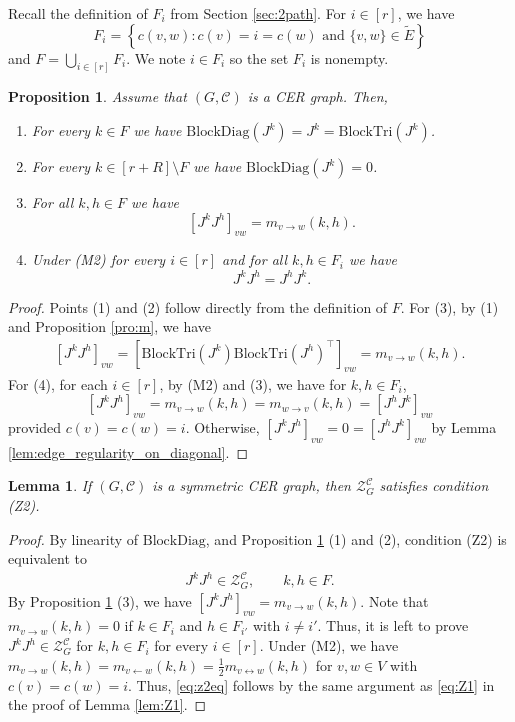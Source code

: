 \documentclass[12pt]{amsart}
\theoremstyle{plain}
\newtheorem{propo}[theorem]{Proposition}
\newtheorem{lemma}[theorem]{Lemma}
\theoremstyle{definition}
\theoremstyle{remark}
\newcommand{\1}{\mathbf{1}}
\newcommand{\coloredZ}{\mathcal{Z}_{G}^{\mathcal{C}}}
\newcommand{\bdiag}{\mathrm{BlockDiag}}
\newcommand{\tri}{\mathrm{BlockTri}}
\begin{document}
Recall the definition of $F_i$ from Section \ref{sec:2path}. 
For $i\in[r]$, we have
\[
F_i = \left\{c(v,w)\colon c(v)=i=c(w)\mbox{ and }\{v,w\}\in \tilde{E}\right\}
\]
and $F = \bigcup_{i\in [r]} F_i$.
We note $i\in F_i$ so the set $F_i$ is nonempty.

\begin{propo}\label{prop:T_diag_properties}
Assume that $(G,\mathcal{C})$ is a CER graph. Then, 
\begin{enumerate}
    \item For every $k\in F$ we have  $\bdiag(J^k) =J^k = \tri(J^k)$. 
    \item For every $k\in[r+R]\setminus F$ we have $\bdiag(J^k) =0$. 
    \item For all $k, h \in F$ we have 
    \[
\left[J^kJ^{h}\right]_{vw} =   m_{v\to w}(k,h). 
    \]
    \item Under (M2) for every $i\in [r]$ and for all $k,h\in F_i$ we have
    \[
J^kJ^h = J^hJ^k.
    \]
\end{enumerate}
\end{propo}
\begin{proof}
Points (1) and (2) follow directly from the definition of $F$. For (3), by (1) and Proposition \ref{pro:m}, we have
\begin{align*}
   \left[J^kJ^{h}\right]_{vw} = \left[\tri(J^k)\tri(J^{h})^\top\right]_{vw} = m_{v\to w}(k,h). 
\end{align*}
For (4), for each $i\in[r]$, by (M2) and (3), we have for $k,h\in F_i$,
\[
[J^kJ^h]_{vw} = m_{v\to w}(k,h) = m_{w\to v}(k,h) = [J^hJ^k]_{vw}
\]
provided $c(v)=c(w)=i$. Otherwise, $[J^kJ^h]_{vw} = 0 = [J^hJ^k]_{vw}$ by Lemma \ref{lem:edge_regularity_on_diagonal}.
\end{proof}

\begin{lemma}\label{lem:Z2}
If \((G,\mathcal{C})\) is a symmetric CER graph, then $\coloredZ$ satisfies condition (Z2). 
\end{lemma}
\begin{proof}
By linearity of $\bdiag$, and Proposition \ref{prop:T_diag_properties} (1) and (2),  condition (Z2) is equivalent to 
\begin{align}\label{eq:z2eq}
J^k J^h \in \coloredZ,\qquad k,h\in F.
\end{align}
By Proposition \ref{prop:T_diag_properties} (3), we have $\left[J^kJ^{h}\right]_{vw} = m_{v\to w}(k,h)$.
Note that $m_{v\to w}(k,h)=0$ if $k \in F_i$ and $h\in F_{i'}$ with $i\neq i'$. Thus, it is left to prove $J^k J^h \in \coloredZ$ for $k,h\in F_i$ for every $i\in[r]$. Under (M2), we have $m_{v\to w}(k,h) = m_{v\leftarrow w}(k,h)=\frac12 m_{v\leftrightarrow w}(k,h)$ for $v,w\in V$ with $c(v)=c(w)=i$. Thus, \eqref{eq:z2eq} follows by the same argument as \eqref{eq:Z1} in the proof of Lemma \ref{lem:Z1}.
\end{proof}
\end{document}
